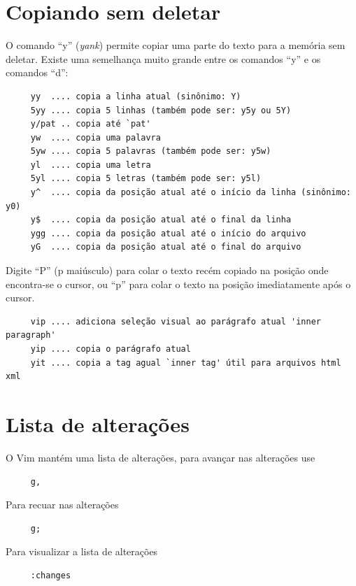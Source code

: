 \documentclass[10pt,a4paper,openany]{book}
\begin{document}
\section{Copiando sem deletar}\label{Copiando sem deletar}

O comando ``y'' ({\em yank}) permite copiar uma parte do texto para a memória sem deletar.
Existe uma semelhança muito grande entre os comandos ``y'' e os comandos ``d'':

\begin{verbatim}
     yy  .... copia a linha atual (sinônimo: Y)
     5yy .... copia 5 linhas (também pode ser: y5y ou 5Y)
     y/pat .. copia até `pat'
     yw  .... copia uma palavra
     5yw .... copia 5 palavras (também pode ser: y5w)
     yl  .... copia uma letra
     5yl .... copia 5 letras (também pode ser: y5l)
     y^  .... copia da posição atual até o início da linha (sinônimo: y0)
     y$  .... copia da posição atual até o final da linha
     ygg .... copia da posição atual até o início do arquivo
     yG  .... copia da posição atual até o final do arquivo
\end{verbatim}

Digite ``P'' (p maiúsculo) para colar o texto recém copiado na posição onde
encontra-se o cursor, ou ``p'' para colar o texto na posição imediatamente
após o cursor.

\begin{verbatim}
     vip .... adiciona seleção visual ao parágrafo atual 'inner paragraph'
     yip .... copia o parágrafo atual
     yit .... copia a tag agual `inner tag' útil para arquivos html xml
\end{verbatim}

\section{Lista de alterações}
O Vim mantém uma lista de alterações, para avançar nas alterações use

\begin{verbatim}
     g,
\end{verbatim}

Para recuar nas alterações

\begin{verbatim}
     g;
\end{verbatim}

Para visualizar a lista de alterações

\begin{verbatim}
     :changes
\end{verbatim}
\end{document}
